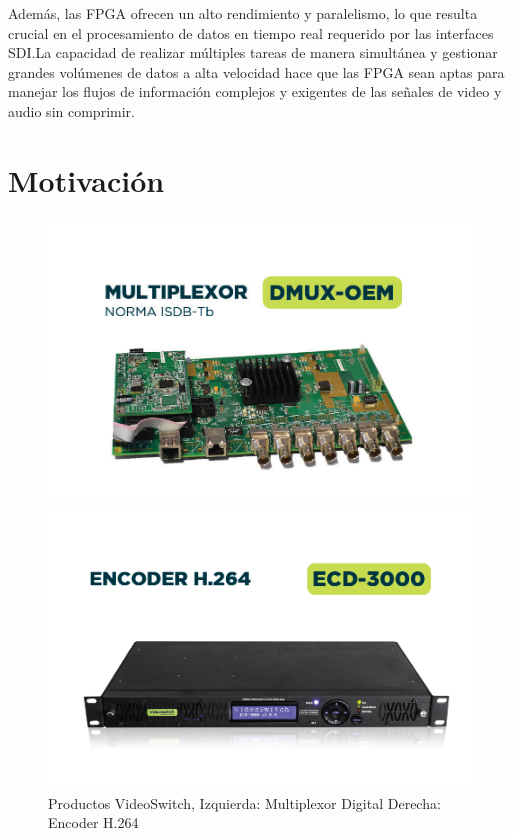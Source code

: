 Además, las FPGA ofrecen un alto rendimiento y paralelismo, lo que resulta
crucial en el procesamiento de datos en tiempo real requerido por las interfaces
SDI.\@ La capacidad de realizar múltiples tareas de manera simultánea y gestionar
grandes volúmenes de datos a alta velocidad hace que las FPGA sean aptas para
manejar los flujos de información complejos y exigentes de las señales de video
y audio sin comprimir.

\section{Motivación}

\vspace{1cm}
\begin{figure}[htbp]
    \centering
    \begin{minipage}{.45\linewidth}
        \includegraphics[width=\linewidth]{./Figures/DMUX-OEM.jpg}
    \end{minipage}
    \hspace{.05\linewidth}
    \begin{minipage}{.45\linewidth}
        \includegraphics[width=\linewidth]{./Figures/ECD-3000.png}
    \end{minipage}
    \caption{Productos VideoSwitch, Izquierda: Multiplexor Digital \- Derecha: Encoder H.264}
        \label{fig:vs-mux-ecd}
\end{figure}
\vspace{1cm}

